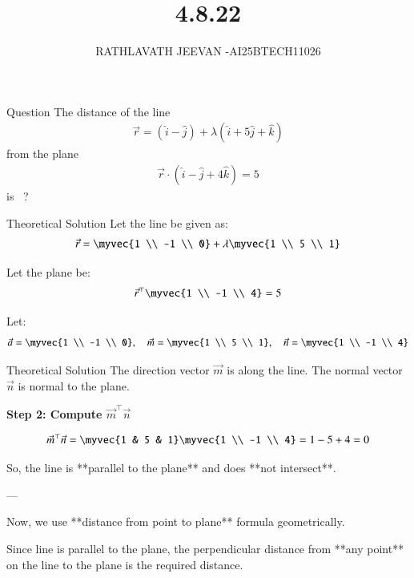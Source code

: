 \documentclass{beamer}
\title %
{4.8.22}
\author %
{RATHLAVATH JEEVAN -AI25BTECH11026}
\begin{document}
\frame{\titlepage}
\begin{frame}{Question}
The distance of the line 
\begin{align}
\vec{r} = (\hat{i} - \hat{j}) + \lambda(\hat{i} + 5\hat{j} + \hat{k})
\end{align}
from the plane 
\begin{align}
\vec{r} \cdot (\hat{i} - \hat{j} + 4\hat{k}) = 5
\end{align}
is \, ?
\end{frame}
 \begin{frame}{Theoretical Solution} 
Let the line be given as:
\begin{align}
\vec{r} = \myvec{1 \\ -1 \\ 0} + \lambda \myvec{1 \\ 5 \\ 1} \label{1}
\end{align}

Let the plane be:
\begin{align}
\vec{r}^\top \myvec{1 \\ -1 \\ 4} = 5 \label{2}
\end{align}

Let:
\begin{align}
\vec{a} = \myvec{1 \\ -1 \\ 0}, \quad \vec{m} = \myvec{1 \\ 5 \\ 1}, \quad \vec{n} = \myvec{1 \\ -1 \\ 4} \label{3}
\end{align}
\end{frame}
\begin{frame}{Theoretical Solution} 
The direction vector \( \vec{m} \) is along the line.  
The normal vector \( \vec{n} \) is normal to the plane.

\textbf{Step 2: Compute \( \vec{m}^\top \vec{n} \)}

\begin{align}
\vec{m}^\top \vec{n} = \myvec{1 & 5 & 1} \myvec{1 \\ -1 \\ 4} = 1 - 5 + 4 = 0 \label{7}
\end{align}


So, the line is **parallel to the plane** and does **not intersect**.

---

Now, we use **distance from point to plane** formula geometrically.

Since line is parallel to the plane, the perpendicular distance from **any point** on the line to the plane is the required distance.

\end{frame}
\end{document}
